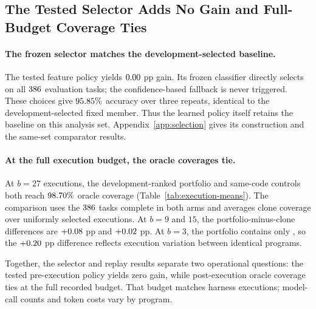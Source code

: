 \subsection{The Tested Selector Adds No Gain and Full-Budget Coverage Ties}\label{sec:utility}
\paragraph{The frozen selector matches the development-selected baseline.}
The tested feature policy yields $0.00$ pp gain. Its frozen
classifier directly selects \bare{} on all $386$ evaluation
tasks; the confidence-based fallback is never triggered. These choices
give $95.85\%$ accuracy over three repeats, identical to the
development-selected fixed member. Thus the learned policy itself
retains the baseline on this analysis set.
Appendix~\ref{app:selection} gives its construction and the
same-set comparator results.

\paragraph{At the full execution budget, the oracle coverages tie.}
\label{sec:selection-result}
At $b=27$ executions, the development-ranked portfolio and same-code
controls both reach $98.70\%$ oracle coverage
(Table~\ref{tab:execution-means}). The comparison uses the
$386$ tasks complete in both arms and averages clone coverage
over uniformly selected executions.
At $b=9$ and $15$, the portfolio-minus-clone differences are
$+0.08$ pp and $+0.02$ pp.
At $b=3$, the portfolio contains only \bare{}, so the
$+0.20$ pp difference reflects execution variation
between identical programs.

\begin{table}[htbp]
\centering\small

\caption{\textbf{Full-budget oracle coverage ties in the recorded executions.}
Each included member contributes three repeats. Clone coverage is the
exact mean over uniform subsets of its $27$ recorded executions,
paired on complete tasks. Both arms use post-execution correctness
at matched harness execution counts.}
\label{tab:execution-means}
\end{table}

Together, the selector and replay results separate two operational
questions: the tested pre-execution policy yields zero gain, while
post-execution oracle coverage ties at the full recorded budget.
That budget matches harness executions; model-call counts and token
costs vary by program.

